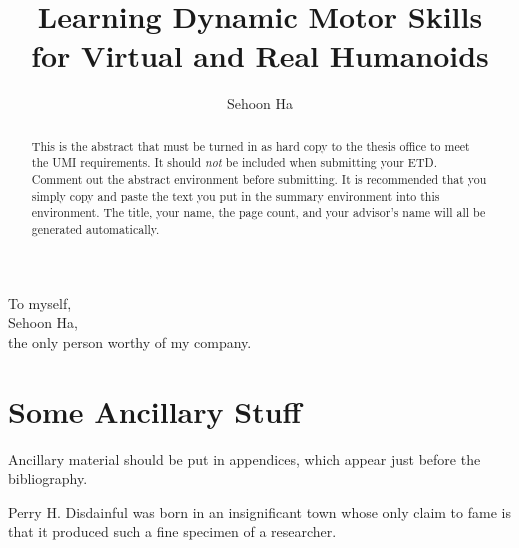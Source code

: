 \documentclass[12pt]{gatech-thesis}
\title{Learning Dynamic Motor Skills \protect\\
  for Virtual and Real Humanoids}
\author{Sehoon Ha}
\begin{document}

\begin{preliminary}
\begin{dedication}
\null\vfil
{\large
\begin{center}
To myself,\\\vspace{12pt}
Sehoon Ha,\\\vspace{12pt}
the only person worthy of my company.
\end{center}}
\vfil\null
\end{dedication}
\begin{acknowledgements}

\end{acknowledgements}
\contents
\begin{summary}

\end{summary}
\end{preliminary}






\appendix
\chapter{Some Ancillary Stuff}

Ancillary material should be put in appendices, which 
appear just before the bibliography. 

\begin{postliminary}
{}
\begin{vita}
Perry H. Disdainful was born in an insignificant town
whose only claim to fame is that it produced such a fine
specimen of a researcher.
\end{vita}
\end{postliminary}

\begin{abstract}
  This is the abstract that must be turned in as hard copy to the
  thesis office to meet the UMI requirements. It should \emph{not} be
  included when submitting your ETD. Comment out the abstract
  environment before submitting. It is recommended that you simply
  copy and paste the text you put in the summary environment into this
  environment. The title, your name, the page count, and your
  advisor's name will all be generated automatically.
\end{abstract}
\end{document}
